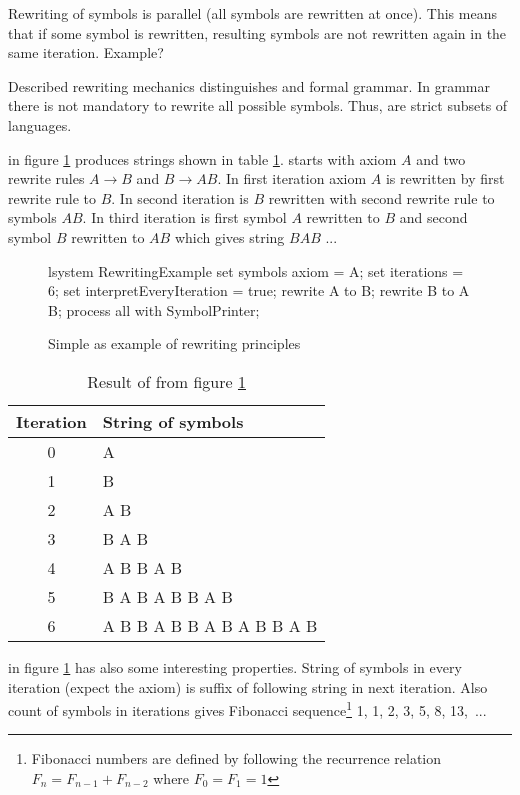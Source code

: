 Rewriting of symbols is parallel (all symbols are rewritten at once).
This means that if some symbol is rewritten, resulting symbols are not rewritten again in the same iteration.
Example?

Described rewriting mechanics distinguishes \lsystem and formal grammar.
In grammar there is not mandatory to rewrite all possible symbols.
Thus, \lsystems are strict subsets of languages.

\lsystem in figure \ref{fig:rrExample} produces strings shown in table \ref{fig:rrExampleResult}.
\lsystem starts with axiom $A$ and two rewrite rules $A \rightarrow B$ and $B \rightarrow A B$.
In first iteration axiom $A$ is rewritten by first rewrite rule to $B$.
In second iteration is $B$ rewritten with second rewrite rule to symbols $A B$.
In third iteration is first symbol $A$ rewritten to $B$ and second symbol $B$ rewritten to $A B$ which gives string $B A B$ ...

\begin{figure}[h]
	\begin{Lsystem}
lsystem RewritingExample {
	set symbols axiom = A;
	set iterations = 6;
	set interpretEveryIteration = true;
	rewrite A to B;
	rewrite B to A B;
}
process all with SymbolPrinter;
	\end{Lsystem}
	\caption{Simple \lsystem as example of rewriting principles}
	\label{fig:rrExample}
\end{figure}

\begin{table}[h]
	\centering
	\begin{tabular}{c l}
   		\toprule
   		Iteration & String of symbols \\
   		\midrule
		0 & A \\
		1 & B \\
		2 & A B \\
		3 & B A B \\
		4 & A B B A B \\
		5 & B A B A B B A B \\
		6 & A B B A B B A B A B B A B \\
		\bottomrule
	\end{tabular}
	\caption{Result of \lsystem from figure \ref{fig:rrExample}}
	\label{fig:rrExampleResult}
\end{table}

\lsystem in figure \ref{fig:rrExample} has also some interesting properties.
String of symbols in every iteration (expect the axiom) is suffix of following string in next iteration.
Also count of symbols in iterations gives Fibonacci sequence\footnote{Fibonacci numbers are defined by following the recurrence relation $F_n = F_{n-1} + F_{n-2}$ where $F_0 = F_1 = 1$} 1, 1, 2, 3, 5, 8, 13,~...

